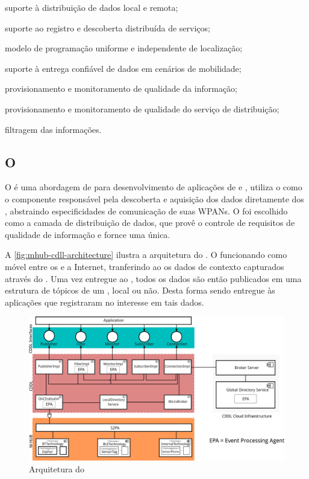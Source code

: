 \begin{alineas}
	\item suporte à distribuição de dados local e remota;

	\item suporte ao registro e descoberta distribuída de serviços;

	\item modelo de programação uniforme e independente de localização;

	\item suporte à entrega confiável de dados em cenários de mobilidade;

	\item provisionamento e monitoramento de qualidade da informação;

	\item provisionamento e monitoramento de qualidade do serviço de distribuição;

	\item filtragem das informações.
\end{alineas}

\subsection*{O \middleware \mhubcddl}

O \mhubcddl é uma abordagem de \middleware para desenvolvimento de aplicações de \iomt e \iot, utiliza o \mhub como o componente responsável pela descoberta e aquisição dos dados diretamente dos \smartobjs, abstraindo especificidades de comunicação de suas WPANs. O \cddl foi escolhido como a camada de distribuição de dados, que provê o controle de requisitos de qualidade de informação e fornce uma \api única.

A \autoref{fig:mhub-cdll-architecture} ilustra a arquitetura do \middleware.
O \mhub funcionando como \gateway móvel entre os \smartobjs e a Internet, tranferindo ao \cddl os dados de contexto capturados através do \eventbus.
Uma vez entregue ao \cddl, todos os dados são então publicados em uma estrutura de tópicos de um \broker \mqtt, local ou não.
Desta forma sendo entregue às aplicações que registraram no \broker interesse em tais dados.

\begin{figure}[htb]
	\centering
	\caption{\label{fig:mhub-cdll-architecture}Arquitetura do \mhubcddl}
	\includegraphics[width=0.85\linewidth]{img/mhub-cddl-architecture.png}
\end{figure}

